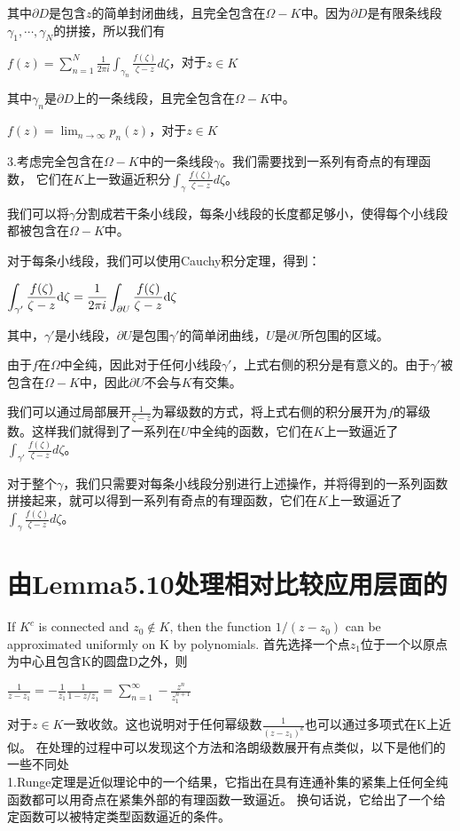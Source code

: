\documentclass[12pt, a4paper, oneside]{article}
\begin{document}
\begin{spacing}{2.0}
其中$\partial D$是包含$z$的简单封闭曲线，且完全包含在$\Omega - K$中。因为$\partial D$是有限条线段$\gamma_1,\cdots,\gamma_N$的拼接，所以我们有

\begin{center}
$f(z) = \displaystyle\sum_{n = 1}^{N}\frac{1}{2\pi i}\int_{\gamma_n}\frac{f(\zeta)}{\zeta - z}d\zeta$，对于$z\in K$
\end{center}

其中$\gamma_n$是$\partial D$上的一条线段，且完全包含在$\Omega - K$中。
\begin{center}
$\displaystyle f(z) = \lim_{n \to \infty}p_n(z)$，对于$z\in K$
\end{center}
3.考虑完全包含在$\Omega-K$中的一条线段$\gamma$。我们需要找到一系列有奇点的有理函数，
它们在$K$上一致逼近积分$\displaystyle\int_{\gamma}\frac{f(\zeta)}{\zeta-z}d\zeta$。

我们可以将$\gamma$分割成若干条小线段，每条小线段的长度都足够小，使得每个小线段都被包含在$\Omega-K$中。

对于每条小线段，我们可以使用Cauchy积分定理，得到：
\begin{center}
    $\displaystyle \displaystyle\int_{\gamma'}\frac{f(\zeta)}{\zeta-z}\mathrm{d\zeta} = \frac{1}{2\pi i} \displaystyle\int_{\partial U}\frac{f(\zeta)}{\zeta - z}\mathrm{d\zeta}$
\end{center}
其中，$\gamma'$是小线段，$\partial U$是包围$\gamma'$的简单闭曲线，$U$是$\partial U$所包围的区域。

由于$f$在$\Omega$中全纯，因此对于任何小线段$\gamma'$，上式右侧的积分是有意义的。由于$\gamma'$被包含在$\Omega-K$中，因此$\partial U$不会与$K$有交集。

我们可以通过局部展开$\frac{1}{\zeta-z}$为幂级数的方式，将上式右侧的积分展开为$f$的幂级数。这样我们就得到了一系列在$U$中全纯的函数，它们在$K$上一致逼近了$\displaystyle\int_{\gamma'}\frac{f(\zeta)}{\zeta-z}d\zeta$。

对于整个$\gamma$，我们只需要对每条小线段分别进行上述操作，并将得到的一系列函数拼接起来，就可以得到一系列有奇点的有理函数，它们在$K$上一致逼近了$\displaystyle\int_{\gamma}\frac{f(\zeta)}{\zeta-z}d\zeta$。


\section{由Lemma5.10处理相对比较应用层面的}
If $K^c$ is connected and $z_0 \notin K$, then the function $1/(z − z_0)$ can be approximated uniformly on K by polynomials.
首先选择一个点$z_1$位于一个以原点为中心且包含K的圆盘D之外，则
\begin{center}
    $\displaystyle\frac{1}{z-z_1} = -\frac{1}{z_1}\frac{1}{1-z/z_1} = \sum_{n = 1}^{\infty}-\frac{z^n}{z_1^{n+1}}$
\end{center}
对于$z\in K$一致收敛。这也说明对于任何幂级数$\frac{1}{(z-z_1)^k}$也可以通过多项式在K上近似。
在处理的过程中可以发现这个方法和洛朗级数展开有点类似，以下是他们的一些不同处\\
1.Runge定理是近似理论中的一个结果，它指出在具有连通补集的紧集上任何全纯函数都可以用奇点在紧集外部的有理函数一致逼近。
换句话说，它给出了一个给定函数可以被特定类型函数逼近的条件。\\


\end{spacing}
\end{document}
